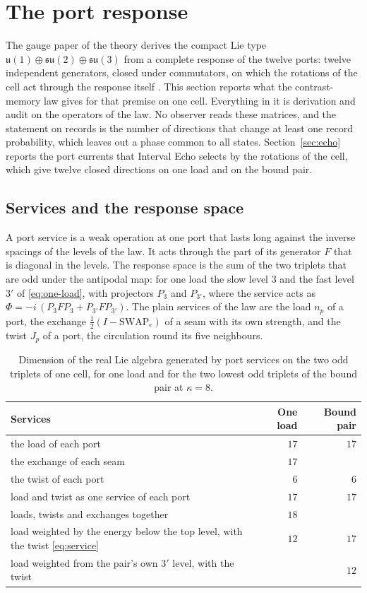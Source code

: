 \documentclass[11pt]{article}
\theoremstyle{definition}
\theoremstyle{remark}
\theoremstyle{plain}
\newcommand{\SWAP}{\mathrm{SWAP}}
\begin{document}
\section{The port response}
\label{sec:response}

The gauge paper of the theory derives the compact Lie type
$\mathfrak u(1)\oplus\mathfrak{su}(2)\oplus\mathfrak{su}(3)$ from a
complete response of the twelve ports: twelve independent generators,
closed under commutators, on which the rotations of the cell act through
the response itself \cite{ophgauge}. This section reports what the
contrast-memory law gives for that premise on one cell. Everything in it is
derivation and audit on the operators of the law. No observer reads these
matrices, and the statement on records is the number of directions that
change at least one record probability, which leaves out a phase common to
all states. Section~\ref{sec:echo} reports the port currents that Interval
Echo selects by the rotations of the cell, which give twelve closed
directions on one load and on the bound pair.

\subsection{Services and the response space}

A port service is a weak operation at one port that lasts long against the
inverse spacings of the levels of the law. It acts through
the part of its generator $F$ that is diagonal in the levels. The response
space is the sum of the two triplets that are odd under the antipodal map:
for one load the slow level $3$ and the fast level $3'$ of
\eqref{eq:one-load}, with projectors $P_3$ and $P_{3'}$, where the service
acts as $\Phi=-i\,(P_3FP_3+P_{3'}FP_{3'})$. The plain services of the law
are the load $n_p$ of a port, the exchange $\tfrac12(I-\SWAP_e)$ of a seam with its
own strength, and the twist $J_p$ of a port, the circulation round its five
neighbours.

\begin{table}[!htb]
\centering
\caption{Dimension of the real Lie algebra generated by port services on
the two odd triplets of one cell, for one load and for the two lowest odd
triplets of the bound pair at $\kappa=8$.}
\label{tab:response}
\begin{tabular}{@{}L{8.6cm}rr@{}}
\toprule
Services & One load & Bound pair \\
\midrule
the load of each port & $17$ & $17$ \\
the exchange of each seam & $17$ & \\
the twist of each port & $6$ & $6$ \\
load and twist as one service of each port & $17$ & $17$ \\
loads, twists and exchanges together & $18$ & \\
load weighted by the energy below the top level, with the twist \eqref{eq:service} & $12$ & $17$ \\
load weighted from the pair's own $3'$ level, with the twist & & $12$ \\
\bottomrule
\end{tabular}
\end{table}
\end{document}
